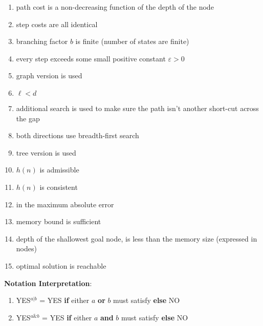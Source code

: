 \begin{multicols}{2}
\begin{enumerate}[itemsep=0.1cm]

\item path cost is a non-decreasing function of the depth of the node
\item step costs are all identical
\item branching factor $b$ is finite (number of states are finite)
\item every step exceeds some small positive constant $\varepsilon > 0$
\item graph version is used
\item $\ell < d$
\item additional search is used to make sure the path isn’t another short-cut across the gap
\item both directions use breadth-first search
\item tree version is used
\item $h(n)$ is admissible
\item $h(n)$ is consistent
\item in the maximum absolute error
\item memory bound is sufficient
\item depth of the shallowest goal node, is less than the memory size (expressed in nodes)
\item optimal solution is reachable

\end{enumerate}
\end{multicols}

\vspace{0.5cm}
\textbf{Notation Interpretation}:
\vspace{0.2cm}
\begin{enumerate}[itemsep=0.2cm]

\item YES$^{a|b}$ = YES \textbf{if} either $a$ \textbf{or} $b$ must satisfy \textbf{else} NO

\item YES$^{a\&b}$ = YES \textbf{if} either $a$ \textbf{and} $b$ must satisfy \textbf{else} NO

\end{enumerate}














